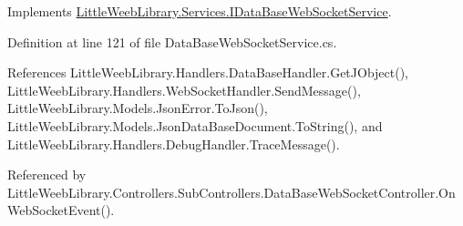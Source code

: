 Implements \mbox{\hyperlink{interface_little_weeb_library_1_1_services_1_1_i_data_base_web_socket_service_abe25bfca603db07eb94658e65d0627dc}{Little\+Weeb\+Library.\+Services.\+I\+Data\+Base\+Web\+Socket\+Service}}.



Definition at line 121 of file Data\+Base\+Web\+Socket\+Service.\+cs.



References Little\+Weeb\+Library.\+Handlers.\+Data\+Base\+Handler.\+Get\+J\+Object(), Little\+Weeb\+Library.\+Handlers.\+Web\+Socket\+Handler.\+Send\+Message(), Little\+Weeb\+Library.\+Models.\+Json\+Error.\+To\+Json(), Little\+Weeb\+Library.\+Models.\+Json\+Data\+Base\+Document.\+To\+String(), and Little\+Weeb\+Library.\+Handlers.\+Debug\+Handler.\+Trace\+Message().



Referenced by Little\+Weeb\+Library.\+Controllers.\+Sub\+Controllers.\+Data\+Base\+Web\+Socket\+Controller.\+On\+Web\+Socket\+Event().


